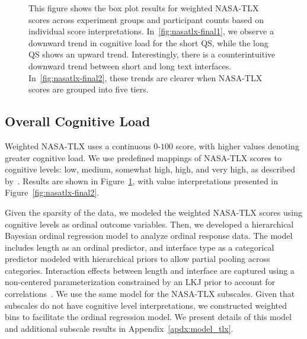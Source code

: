\begin{figure}[htbp]
    \caption{This figure shows the box plot results for weighted NASA-TLX scores across experiment groups and participant counts based on individual score interpretations. In~\ref{fig:nasatlx-final1}, we observe a downward trend in cognitive load for the short QS, while the long QS shows an upward trend. Interestingly, there is a counterintuitive downward trend between short and long text interfaces. In~\ref{fig:nasatlx-final2}, these trends are clearer when NASA-TLX scores are grouped into five tiers.}
    \label{fig:nasatlx-final}
\end{figure}

\subsection{Overall Cognitive Load}
\label{sec:cog_overall}
Weighted NASA-TLX uses a continuous $0$-$100$ score, with higher values denoting greater cognitive load. We use predefined mappings of NASA-TLX scores to cognitive levels: low, medium, somewhat high, high, and very high, as described by~\textcite{hart1988development}. Results are shown in Figure~\ref{fig:nasatlx-final}, with value interpretations presented in Figure~\ref{fig:nasatlx-final2}.

Given the sparsity of the data, we modeled the weighted NASA-TLX scores using cognitive levels as ordinal outcome variables. Then, we developed a hierarchical Bayesian ordinal regression model to analyze ordinal response data. The model includes length as an ordinal predictor, and interface type as a categorical predictor modeled with hierarchical priors to allow partial pooling across categories. Interaction effects between length and interface are captured using a non-centered parameterization constrained by an LKJ prior to account for correlations~\cite{mcelreath2018statistical}. We use the same model for the NASA-TLX subscales. Given that subscales do not have cognitive level interpretations, we constructed weighted bins to facilitate the ordinal regression model. We present details of this model and additional subscale results in Appendix~\ref{apdx:model_tlx}.

